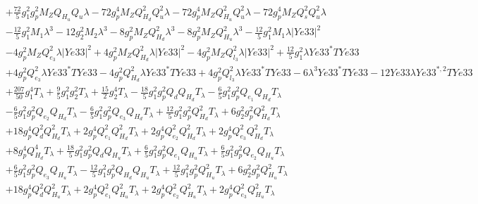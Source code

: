 \begin{align}
 &+\frac{72}{5} g_{1}^{2} g_{p}^{2} M_Z Q_{H_u} Q_{u} \lambda -72 g_{p}^{4} M_Z Q_{H_d}^{2} Q_{u}^{2} \lambda -72 g_{p}^{4} M_Z Q_{H_u}^{2} Q_{u}^{2} \lambda -72 g_{p}^{4} M_Z Q_{s}^{2} Q_{u}^{2} \lambda \nonumber \\ 
 &-\frac{12}{5} g_{1}^{2} M_1 \lambda^{3} -12 g_{2}^{2} M_2 \lambda^{3} -8 g_{p}^{2} M_Z Q_{H_d}^{2} \lambda^{3} -8 g_{p}^{2} M_Z Q_{H_u}^{2} \lambda^{3} -\frac{12}{5} g_{1}^{2} M_1 \lambda |Ye33|^2 \nonumber \\ 
 &-4 g_{p}^{2} M_Z Q_{e_3}^{2} \lambda |Ye33|^2 +4 g_{p}^{2} M_Z Q_{H_d}^{2} \lambda |Ye33|^2 -4 g_{p}^{2} M_Z Q_{l_3}^{2} \lambda |Ye33|^2 +\frac{12}{5} g_{1}^{2} \lambda Ye33^* TYe33 \nonumber \\ 
 &+4 g_{p}^{2} Q_{e_3}^{2} \lambda Ye33^* TYe33 -4 g_{p}^{2} Q_{H_d}^{2} \lambda Ye33^* TYe33 +4 g_{p}^{2} Q_{l_3}^{2} \lambda Ye33^* TYe33 -6 \lambda^{3} Ye33^* TYe33 -12 Ye33 \lambda Ye33^{*,2} TYe33 \nonumber \\ 
 &+\frac{207}{50} g_{1}^{4} T_{\lambda} +\frac{9}{5} g_{1}^{2} g_{2}^{2} T_{\lambda} +\frac{15}{2} g_{2}^{4} T_{\lambda} -\frac{18}{5} g_{1}^{2} g_{p}^{2} Q_{d} Q_{H_d} T_{\lambda} -\frac{6}{5} g_{1}^{2} g_{p}^{2} Q_{e_{1}} Q_{H_d} T_{\lambda} \nonumber \\ 
 &-\frac{6}{5} g_{1}^{2} g_{p}^{2} Q_{e_{2}} Q_{H_d} T_{\lambda} -\frac{6}{5} g_{1}^{2} g_{p}^{2} Q_{e_3} Q_{H_d} T_{\lambda} +\frac{12}{5} g_{1}^{2} g_{p}^{2} Q_{H_d}^{2} T_{\lambda} +6 g_{2}^{2} g_{p}^{2} Q_{H_d}^{2} T_{\lambda} \nonumber \\ 
 &+18 g_{p}^{4} Q_{d}^{2} Q_{H_d}^{2} T_{\lambda} +2 g_{p}^{4} Q_{e_{1}}^{2} Q_{H_d}^{2} T_{\lambda} +2 g_{p}^{4} Q_{e_{2}}^{2} Q_{H_d}^{2} T_{\lambda} +2 g_{p}^{4} Q_{e_3}^{2} Q_{H_d}^{2} T_{\lambda} \nonumber \\ 
 &+8 g_{p}^{4} Q_{H_d}^{4} T_{\lambda} +\frac{18}{5} g_{1}^{2} g_{p}^{2} Q_{d} Q_{H_u} T_{\lambda} +\frac{6}{5} g_{1}^{2} g_{p}^{2} Q_{e_{1}} Q_{H_u} T_{\lambda} +\frac{6}{5} g_{1}^{2} g_{p}^{2} Q_{e_{2}} Q_{H_u} T_{\lambda} \nonumber \\ 
 &+\frac{6}{5} g_{1}^{2} g_{p}^{2} Q_{e_3} Q_{H_u} T_{\lambda} -\frac{12}{5} g_{1}^{2} g_{p}^{2} Q_{H_d} Q_{H_u} T_{\lambda} +\frac{12}{5} g_{1}^{2} g_{p}^{2} Q_{H_u}^{2} T_{\lambda} +6 g_{2}^{2} g_{p}^{2} Q_{H_u}^{2} T_{\lambda} \nonumber \\ 
 &+18 g_{p}^{4} Q_{d}^{2} Q_{H_u}^{2} T_{\lambda} +2 g_{p}^{4} Q_{e_{1}}^{2} Q_{H_u}^{2} T_{\lambda} +2 g_{p}^{4} Q_{e_{2}}^{2} Q_{H_u}^{2} T_{\lambda} +2 g_{p}^{4} Q_{e_3}^{2} Q_{H_u}^{2} T_{\lambda} \nonumber \\ 

\end{align}
